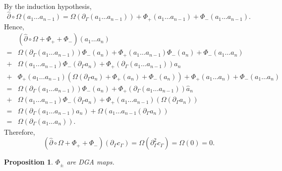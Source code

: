 \documentclass[11pt]{amsart}
\makeatletter
\renewenvironment{proof}[1][\proofname] {\par\pushQED{\qed}{\normalfont\bfseries\topsep6\p@\@plus6\p@\relax #1\@addpunct{.} }}{\popQED\endtrivlist\@endpefalse}
\theoremstyle{mystyle}
\newtheorem{proposition}[proposition]{Proposition}
\newcommand{\<}{\langle}
\renewcommand{\>}{\rangle}
\makeatother
\begin{document}
\begin{proof}
\begin{align*}
	\end{align*} By the induction hypothesis, \[\widehat{\partial} \circ \Omega(a_1\dots a_{n-1}) = \Omega(\partial_\Gamma (a_1\dots a_{n-1})) + \Phi_+(a_1\dots a_{n-1}) + \Phi_-(a_1\dots a_{n-1}).\] Hence, \begin{align*}
		&(\widehat{\partial} \circ \Omega + \Phi_+ + \Phi_-)(a_1\dots a_n) \\
		=& \Omega(\partial_\Gamma (a_1\dots a_{n-1}))\Phi_-(a_n) + \Phi_+(a_1\dots a_{n-1})\Phi_-(a_n) + \Phi_-(a_1\dots a_n) \\
		+& \Omega(a_1\dots a_{n-1})\Phi_-(\partial_\Gamma a_n) + \Phi_+(\partial_\Gamma(a_1\dots a_{n-1}))\widehat{a}_n \\
		+& \Phi_+(a_1\dots a_{n-1})(\Omega(\partial_\Gamma a_n) + \Phi_+(a_n) + \Phi_-(a_n)) + \Phi_+(a_1\dots a_n) + \Phi_-(a_1\dots a_n) \\
		=& \Omega(\partial_\Gamma (a_1\dots a_{n-1}))\Phi_-(a_n) + \Phi_+(\partial_\Gamma(a_1\dots a_{n-1}))\widehat{a}_n \\
		+& \Omega(a_1\dots a_{n-1})\Phi_-(\partial_\Gamma a_n) + \Phi_+(a_1\dots a_{n-1})(\Omega(\partial_\Gamma a_n)) \\
		=& \Omega(\partial_\Gamma (a_1\dots a_{n-1})a_n) + \Omega(a_1\dots a_{n-1}(\partial_\Gamma a_n)) \\
		=& \Omega(\partial_\Gamma(a_1\dots a_n)).
	\end{align*} Therefore, \[(\widehat{\partial} \circ \Omega + \Phi_+ + \Phi_-)(\partial_\Gamma c_\Gamma) = \Omega(\partial_\Gamma^2 c_\Gamma) = \Omega(0) = 0.\]
\end{proof}

\begin{proposition}\label{prop:phipmDGA} 
	$\Phi_{\pm}$ are DGA maps.
\end{proposition}
\end{document}
